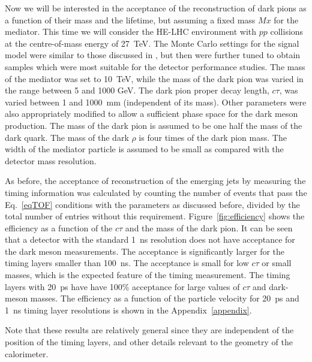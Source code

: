 Now we will be interested in the acceptance  of the reconstruction of dark pions  as a function of their mass
and the lifetime, but assuming a fixed mass $Mx$ for the mediator. This time we will consider the HE-LHC environment with $pp$ collisions at the centre-of-mass energy of 27~TeV.    
 The Monte Carlo settings for the signal model were similar
to those discussed in  \cite{Sirunyan:2018njd}, but then were further tuned \cite{prive} to obtain samples  which were most suitable
for the detector performance studies. 
The mass of the mediator was set to 10~TeV, while the mass of the dark pion was varied in the range between 5 and 1000 GeV.
The dark pion proper decay length, $c\tau$,  was varied between 1 and 1000~mm (independent of its mass). Other parameters
were also appropriately modified to allow a sufficient phase space for the dark meson production.
The mass of the dark pion is assumed to be one half the mass of the dark quark. The mass of the dark
$\rho$ is four times of the dark pion mass. The width of the
mediator particle is assumed to be small as compared with the detector mass resolution.


As before, the acceptance of reconstruction of the emerging jets by measuring the timing information was calculated by counting the number of events that pass the 
Eq.~\ref{eqTOF} conditions  with the parameters as discussed before, divided by the total number of entries
without this requirement. Figure~\ref{fig:efficiency} shows the efficiency
as a function of the $c\tau$ and the mass of the dark pion. It can be seen that a detector with the standard 1~ns resolution does
not have acceptance for the dark meson measurements. The acceptance is significantly larger for the timing layers smaller than 100~ns.
The acceptance is small for low $c\tau$ or small masses, which is the expected feature of the timing measurement.
The timing layers with 20~ps have have 100\% acceptance for large values of $c\tau$ and dark-meson masses.
The efficiency as a function of the particle velocity for 20~ps and 1~ns timing layer resolutions
is shown in the Appendix~\ref{appendix}.

Note that these results are relatively general since they are 
independent of the position of the timing layers, and other details relevant to 
the geometry of the calorimeter.  

